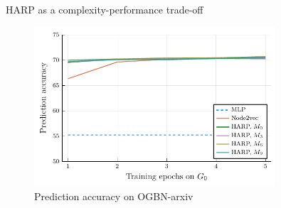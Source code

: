 \documentclass[10pt]{beamer}
\begin{document}
\begin{frame}{HARP as a complexity-performance trade-off}
	\begin{figure}
		\centering
		\includegraphics[width=0.8\textwidth]{images/steps_accur/steps_accur.pdf}
		\caption{Prediction accuracy on OGBN-arxiv}
	\end{figure}
\end{frame}

\begin{frame}
	\centering
\end{frame}
\end{document}
